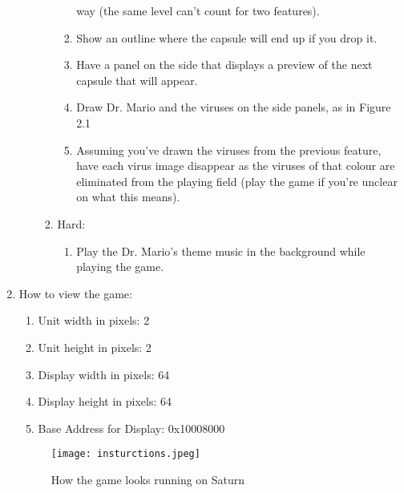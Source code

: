 \documentclass{article}
\begin{document}
\begin{enumerate}
\begin{enumerate}
\begin{enumerate}
\begin{enumerate}
way (the same level can’t count for two features).
                \item Show an outline where the capsule will end up if you drop it.
                \item Have a panel on the side that displays a preview of the next capsule that will appear.
                \item Draw Dr. Mario and the viruses on the side panels, as in Figure 2.1
                \item Assuming you’ve drawn the viruses from the previous feature, have each virus image disappear
as the viruses of that colour are eliminated from the playing field (play the game if you’re unclear
on what this means).
            \end{enumerate}
          \item Hard:
          \begin{enumerate}
              \item Play the Dr. Mario’s theme music in the background while playing the game.
          \end{enumerate}
        \end{enumerate}
    \end{enumerate}

    \item How to view the game:
    
    \begin{enumerate}

    \item Unit width in pixels:       2
    \item Unit height in pixels:      2
    \item Display width in pixels:    64
    \item Display height in pixels:   64
    \item Base Address for Display:   0x10008000


    \end{enumerate}

    

\begin{figure}[ht!]
    \centering
    \texttt{[image: insturctions.jpeg]}
    \caption{How the game looks running on Saturn}
    \label{Instructions}
\end{figure}


\end{enumerate}
\end{document}
